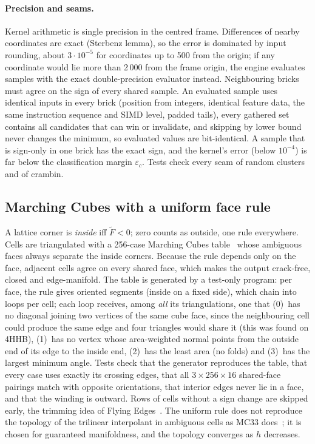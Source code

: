\paragraph{Precision and seams.}
Kernel arithmetic is single precision in the centred frame. Differences of
nearby coordinates are exact (Sterbenz lemma), so the error is dominated
by input rounding, about $3\cdot10^{-5}$\Ang{} for coordinates up to
500\Ang{} from the origin; if any coordinate would lie more than 2\,000\Ang{}
from the frame origin, the engine evaluates samples with the exact
double-precision evaluator instead. Neighbouring bricks must agree on the
sign of every shared sample. An evaluated sample uses identical inputs in
every brick (position from integers, identical feature data, the same
instruction sequence and SIMD level, padded tails), every gathered set
contains all candidates that can win or invalidate, and skipping by lower
bound never changes the minimum, so evaluated values are bit-identical. A
sample that is sign-only in one brick has the exact sign, and the kernel's
error (below $10^{-4}$\Ang) is far below the classification margin
$\varepsilon_c$. Tests check every seam of random clusters and of crambin.

\subsection{Marching Cubes with a uniform face rule}
\label{sec:mc}

A lattice corner is \emph{inside} iff $\tilde F < 0$; zero counts as
outside, one rule everywhere. Cells are triangulated with a 256-case
Marching Cubes table~\cite{lorensen1987} whose ambiguous faces always
separate the inside corners. Because the rule depends only on the face,
adjacent cells agree on every shared face, which makes the output
crack-free, closed and edge-manifold. The table is generated by a
test-only program: per face, the rule gives oriented segments (inside on a
fixed side), which chain into loops per cell; each loop receives, among
\emph{all} its triangulations, one that (0)~has no diagonal joining two
vertices of the same cube face, since the neighbouring cell could produce
the same edge and four triangles would share it (this was found on 4HHB),
(1)~has no vertex whose area-weighted normal points from the outside end of
its edge to the inside end, (2)~has the least area (no folds) and (3)~has
the largest minimum angle. Tests check that the generator reproduces the
table, that every case uses exactly its crossing edges, that all
$3 \times 256 \times 16$ shared-face pairings match with opposite
orientations, that interior edges never lie in a face, and that the winding
is outward. Rows of cells without a sign change are skipped early, the
trimming idea of Flying Edges~\cite{schroeder2015}. The uniform rule does
not reproduce the topology of the trilinear interpolant in ambiguous cells
as MC33 does~\cite{lewiner2003,custodio2013}; it is chosen for guaranteed
manifoldness, and the topology converges as $h$ decreases.

